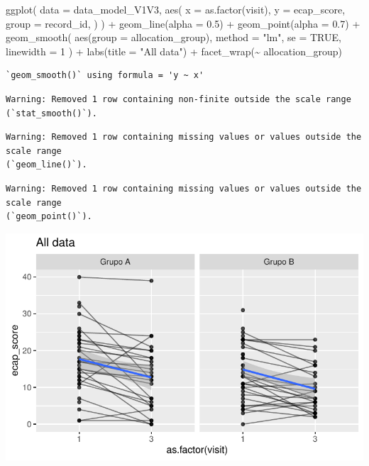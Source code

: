 \documentclass[
  letterpaper,
  DIV=11,
  numbers=noendperiod]{scrartcl}
\newenvironment{Shaded}{\begin{snugshade}}{\end{snugshade}}
\newcommand{\AttributeTok}[1]{\textcolor[rgb]{0.40,0.45,0.13}{#1}}
\newcommand{\ConstantTok}[1]{\textcolor[rgb]{0.56,0.35,0.01}{#1}}
\newcommand{\DecValTok}[1]{\textcolor[rgb]{0.68,0.00,0.00}{#1}}
\newcommand{\FloatTok}[1]{\textcolor[rgb]{0.68,0.00,0.00}{#1}}
\newcommand{\FunctionTok}[1]{\textcolor[rgb]{0.28,0.35,0.67}{#1}}
\newcommand{\NormalTok}[1]{\textcolor[rgb]{0.00,0.23,0.31}{#1}}
\newcommand{\SpecialCharTok}[1]{\textcolor[rgb]{0.37,0.37,0.37}{#1}}
\newcommand{\StringTok}[1]{\textcolor[rgb]{0.13,0.47,0.30}{#1}}
\begin{document}
\begin{Shaded}
\begin{Highlighting}[]
\FunctionTok{ggplot}\NormalTok{(}
    \AttributeTok{data =}\NormalTok{ data\_model\_V1V3, }
    \FunctionTok{aes}\NormalTok{(}
        \AttributeTok{x =} \FunctionTok{as.factor}\NormalTok{(visit),}
        \AttributeTok{y =}\NormalTok{ ecap\_score,}
        \AttributeTok{group =}\NormalTok{ record\_id,}
\NormalTok{    )}
\NormalTok{) }\SpecialCharTok{+}
    \FunctionTok{geom\_line}\NormalTok{(}\AttributeTok{alpha =} \FloatTok{0.5}\NormalTok{) }\SpecialCharTok{+}
    \FunctionTok{geom\_point}\NormalTok{(}\AttributeTok{alpha =} \FloatTok{0.7}\NormalTok{) }\SpecialCharTok{+}
    \FunctionTok{geom\_smooth}\NormalTok{(}
        \FunctionTok{aes}\NormalTok{(}\AttributeTok{group =}\NormalTok{ allocation\_group),}
        \AttributeTok{method =} \StringTok{"lm"}\NormalTok{,}
        \AttributeTok{se =} \ConstantTok{TRUE}\NormalTok{,}
        \AttributeTok{linewidth =} \DecValTok{1}
\NormalTok{    ) }\SpecialCharTok{+}
    \FunctionTok{labs}\NormalTok{(}\AttributeTok{title =} \StringTok{"All data"}\NormalTok{) }\SpecialCharTok{+}
    \FunctionTok{facet\_wrap}\NormalTok{(}\SpecialCharTok{\textasciitilde{}}\NormalTok{ allocation\_group)}
\end{Highlighting}
\end{Shaded}

\begin{verbatim}
`geom_smooth()` using formula = 'y ~ x'
\end{verbatim}

\begin{verbatim}
Warning: Removed 1 row containing non-finite outside the scale range
(`stat_smooth()`).
\end{verbatim}

\begin{verbatim}
Warning: Removed 1 row containing missing values or values outside the scale range
(`geom_line()`).
\end{verbatim}

\begin{verbatim}
Warning: Removed 1 row containing missing values or values outside the scale range
(`geom_point()`).
\end{verbatim}

\includegraphics{Outcomes_V1V2V3_files/figure-pdf/ecap_score_6-1.pdf}
\end{document}
